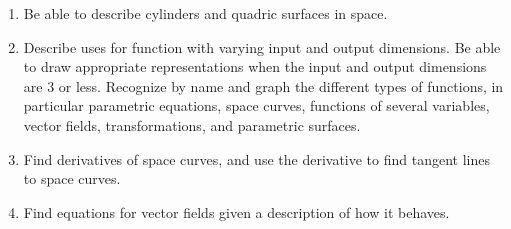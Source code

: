 

\begin{enumerate}
\item Be able to describe cylinders and quadric surfaces in space.
\item Describe uses for function with varying input and output
  dimensions.  Be able to draw appropriate representations when the
  input and output dimensions are 3 or less. Recognize by name and
  graph the different types of functions, in particular parametric
  equations, space curves, functions of several variables, vector
  fields, transformations, and parametric surfaces.
\item Find derivatives of space curves, and use the derivative to find
  tangent lines to space curves.
\item Find equations for vector fields given a description of how it behaves.
\end{enumerate}


